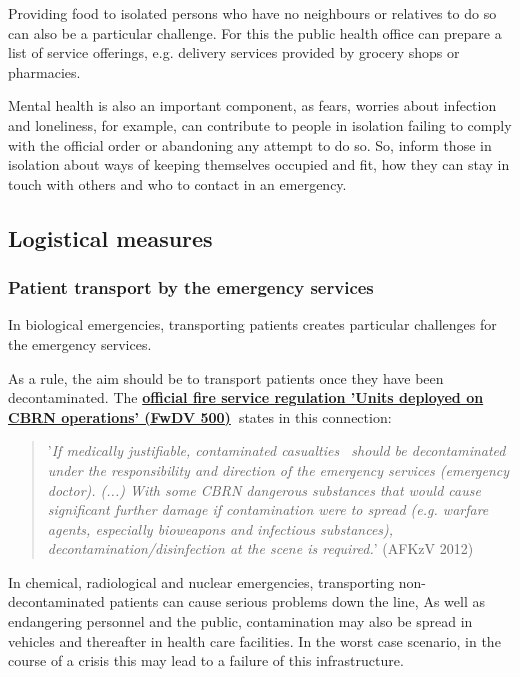 \documentclass{article}
\begin{document}
Providing food to isolated persons who have no neighbours or relatives to do so can also be a particular challenge. For this the public health office can prepare a list of service offerings, e.g. delivery services provided by grocery shops or pharmacies.


Mental health is also an important component, as fears, worries about infection and loneliness, for example, can contribute to people in isolation failing to comply with the official order or abandoning any attempt to do so. So, inform those in isolation about ways of keeping themselves occupied and fit, how they can stay in touch with others and who to contact in an emergency.


\subsection{Logistical measures}\label{H952937}



\subsubsection{Patient transport by the emergency services}\label{H4700982}



In biological emergencies, transporting patients creates particular challenges for the emergency services.


As a rule, the aim should be to transport patients once they have been decontaminated. The \textbf{\href{https://www.bbk.bund.de/SharedDocs/Downloads/BBK/DE/FIS/DownloadsRechtundVorschriften/Volltext_Fw_Dv/FwDV%20-2012.1.pdf}{official fire service regulation 'Units deployed on CBRN operations' (FwDV 500)}}\textbf{ }states in this connection:

\begin{quote}



'\emph{If medically justifiable, contaminated casualties  should be decontaminated under the responsibility and direction of the emergency services (emergency doctor). (...) With some CBRN dangerous substances that would cause significant further damage if contamination were to spread (e.g. warfare agents, especially bioweapons and infectious substances), decontamination/disinfection at the scene is required.}' (AFKzV 2012)


\end{quote}


In chemical, radiological and nuclear emergencies, transporting non-decontaminated patients can cause serious problems down the line, As well as endangering personnel and the public, contamination may also be spread in vehicles and thereafter in health care facilities. In the worst case scenario, in the course of a crisis this may lead to a failure of this infrastructure.
\end{document}
